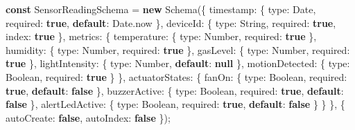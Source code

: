 \documentclass[11pt,oneside,openany]{book}
\newenvironment{Shaded}{\begin{snugshade}}{\end{snugshade}}
\newcommand{\AttributeTok}[1]{\textcolor[rgb]{0.16,0.50,0.73}{#1}}
\newcommand{\BuiltInTok}[1]{\textcolor[rgb]{0.50,0.55,0.55}{#1}}
\newcommand{\ControlFlowTok}[1]{\textcolor[rgb]{0.99,0.74,0.29}{\textbf{#1}}}
\newcommand{\DataTypeTok}[1]{\textcolor[rgb]{0.16,0.50,0.73}{#1}}
\newcommand{\FunctionTok}[1]{\textcolor[rgb]{0.56,0.27,0.68}{#1}}
\newcommand{\KeywordTok}[1]{\textcolor[rgb]{0.81,0.81,0.76}{\textbf{#1}}}
\newcommand{\NormalTok}[1]{\textcolor[rgb]{0.81,0.81,0.76}{#1}}
\newcommand{\OperatorTok}[1]{\textcolor[rgb]{0.81,0.81,0.76}{#1}}
\renewenvironment{Shaded}{%
  \def\FrameCommand{\fboxsep=8pt\colorbox{shadecolor}}%
  \MakeFramed{\advance\hsize-\width\FrameRestore}%
}{\endMakeFramed}
\begin{document}
\begin{Shaded}
\begin{Highlighting}[]
\KeywordTok{const}\NormalTok{ SensorReadingSchema }\OperatorTok{=} \KeywordTok{new} \FunctionTok{Schema}\NormalTok{(\{}
  \DataTypeTok{timestamp}\OperatorTok{:}\NormalTok{ \{ }\DataTypeTok{type}\OperatorTok{:} \BuiltInTok{Date}\OperatorTok{,} \DataTypeTok{required}\OperatorTok{:} \KeywordTok{true}\OperatorTok{,} \ControlFlowTok{default}\OperatorTok{:} \BuiltInTok{Date}\OperatorTok{.}\AttributeTok{now}\NormalTok{ \}}\OperatorTok{,}
  \DataTypeTok{deviceId}\OperatorTok{:}\NormalTok{ \{ }\DataTypeTok{type}\OperatorTok{:} \BuiltInTok{String}\OperatorTok{,} \DataTypeTok{required}\OperatorTok{:} \KeywordTok{true}\OperatorTok{,} \DataTypeTok{index}\OperatorTok{:} \KeywordTok{true}\NormalTok{ \}}\OperatorTok{,}
  \DataTypeTok{metrics}\OperatorTok{:}\NormalTok{ \{}
    \DataTypeTok{temperature}\OperatorTok{:}\NormalTok{ \{ }\DataTypeTok{type}\OperatorTok{:} \BuiltInTok{Number}\OperatorTok{,} \DataTypeTok{required}\OperatorTok{:} \KeywordTok{true}\NormalTok{ \}}\OperatorTok{,}
    \DataTypeTok{humidity}\OperatorTok{:}\NormalTok{ \{ }\DataTypeTok{type}\OperatorTok{:} \BuiltInTok{Number}\OperatorTok{,} \DataTypeTok{required}\OperatorTok{:} \KeywordTok{true}\NormalTok{ \}}\OperatorTok{,}
    \DataTypeTok{gasLevel}\OperatorTok{:}\NormalTok{ \{ }\DataTypeTok{type}\OperatorTok{:} \BuiltInTok{Number}\OperatorTok{,} \DataTypeTok{required}\OperatorTok{:} \KeywordTok{true}\NormalTok{ \}}\OperatorTok{,}
    \DataTypeTok{lightIntensity}\OperatorTok{:}\NormalTok{ \{ }\DataTypeTok{type}\OperatorTok{:} \BuiltInTok{Number}\OperatorTok{,} \ControlFlowTok{default}\OperatorTok{:} \KeywordTok{null}\NormalTok{ \}}\OperatorTok{,}
    \DataTypeTok{motionDetected}\OperatorTok{:}\NormalTok{ \{ }\DataTypeTok{type}\OperatorTok{:} \BuiltInTok{Boolean}\OperatorTok{,} \DataTypeTok{required}\OperatorTok{:} \KeywordTok{true}\NormalTok{ \}}
\NormalTok{  \}}\OperatorTok{,}
  \DataTypeTok{actuatorStates}\OperatorTok{:}\NormalTok{ \{}
    \DataTypeTok{fanOn}\OperatorTok{:}\NormalTok{ \{ }\DataTypeTok{type}\OperatorTok{:} \BuiltInTok{Boolean}\OperatorTok{,} \DataTypeTok{required}\OperatorTok{:} \KeywordTok{true}\OperatorTok{,} \ControlFlowTok{default}\OperatorTok{:} \KeywordTok{false}\NormalTok{ \}}\OperatorTok{,}
    \DataTypeTok{buzzerActive}\OperatorTok{:}\NormalTok{ \{ }\DataTypeTok{type}\OperatorTok{:} \BuiltInTok{Boolean}\OperatorTok{,} \DataTypeTok{required}\OperatorTok{:} \KeywordTok{true}\OperatorTok{,} \ControlFlowTok{default}\OperatorTok{:} \KeywordTok{false}\NormalTok{ \}}\OperatorTok{,}
    \DataTypeTok{alertLedActive}\OperatorTok{:}\NormalTok{ \{ }\DataTypeTok{type}\OperatorTok{:} \BuiltInTok{Boolean}\OperatorTok{,} \DataTypeTok{required}\OperatorTok{:} \KeywordTok{true}\OperatorTok{,} \ControlFlowTok{default}\OperatorTok{:} \KeywordTok{false}\NormalTok{ \}}
\NormalTok{  \}}
\NormalTok{\}}\OperatorTok{,}\NormalTok{ \{}
  \DataTypeTok{autoCreate}\OperatorTok{:} \KeywordTok{false}\OperatorTok{,}
  \DataTypeTok{autoIndex}\OperatorTok{:} \KeywordTok{false}
\NormalTok{\})}\OperatorTok{;}
\end{Highlighting}
\end{Shaded}
\end{document}
